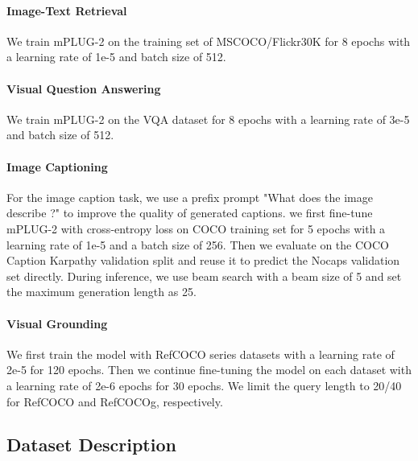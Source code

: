 \documentclass{article}
\theoremstyle{plain}
\theoremstyle{definition}
\theoremstyle{remark}
\newcommand{\modelname}{mPLUG-2 }
\newcommand{\modelnamebase}{mPLUG-2 }
\begin{document}
\paragraph{Image-Text Retrieval}

We train \modelname on the training set of MSCOCO/Flickr30K for 8 epochs with a learning rate of 1e-5 and batch size of 512.

\paragraph{Visual Question Answering}
We train \modelnamebase on the VQA dataset for 8 epochs with a learning rate of 3e-5 and batch size of 512.

\paragraph{Image Captioning}

For the image caption task, we use a prefix prompt "What does the image describe ?" to improve the quality of generated captions.
we first fine-tune \modelname with cross-entropy loss on COCO training set for 5 epochs with a learning rate of 1e-5 and a batch size of 256. Then we evaluate on the COCO Caption Karpathy validation split and reuse it to predict the Nocaps validation set directly. During inference, we use beam search with a beam size of 5 and set the maximum generation length as 25.

\paragraph{Visual Grounding}
We first train the model with RefCOCO series datasets with a learning rate of 2e-5 for 120 epochs. Then we continue fine-tuning the model on each dataset with a learning rate of 2e-6 epochs for 30 epochs. We limit the query length to 20/40 for RefCOCO and RefCOCOg, respectively.


\subsection{Dataset Description}
\end{document}
